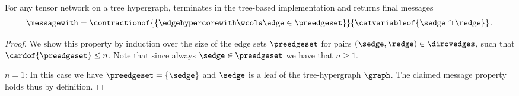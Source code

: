 \begin{lemma}
    \label{lem:messageAsContraction}
    For any tensor network on a tree hypergraph,  terminates in the tree-based implementation and returns final messages
    \begin{align*}
        \messagewith
        = \contractionof{\{\edgehypercorewith\wcols\edge\in\preedgeset\}}{\catvariableof{\sedge\cap\redge}}\,.
    \end{align*}
\end{lemma}
\begin{proof}
    We show this property by induction over the size of the edge sets $\preedgeset$ for pairs $(\sedge,\redge)\in\dirovedges$, such that $\cardof{\preedgeset}\leq n$.
    Note that since always $\sedge\in\preedgeset$ we have that $n\geq1$.

    $n=1$: In this case we have $\preedgeset=\{\sedge\}$ and $\sedge$ is a leaf of the tree-hypergraph $\graph$.
    The claimed message property holds thus by definition.


\end{proof}
